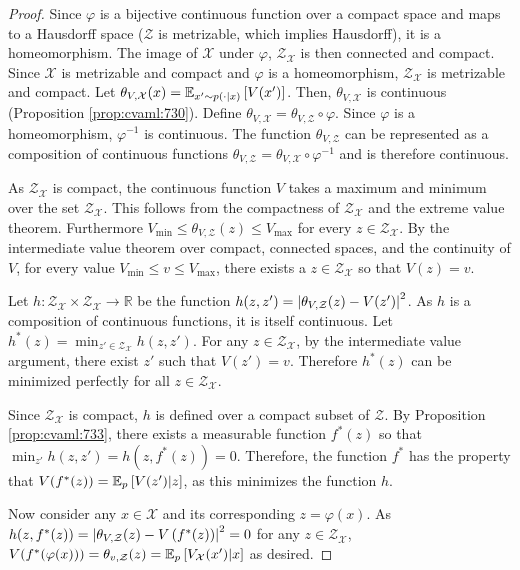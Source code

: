 \begin{proof}
    
Since $\varphi$ is a bijective continuous function over a compact space and maps to a Hausdorff space ($\mathcal{Z}$ is metrizable, which implies Hausdorff), it is a homeomorphism.
The image of $\mathcal{X}$ under $\varphi$, $\mathcal{Z}_\mathcal{X}$ is then connected and compact.
Since $\mathcal{X}$ is metrizable and compact and $\varphi$ is a homeomorphism, $\mathcal{Z}_\mathcal{X}$ is metrizable and compact.
Let $\theta_{V,\mathcal{X}}(x) = \mathbb{E}_{x' \sim p(\cdot|x)}\left[  V(x') \right]$.
Then, $\theta_{V,\mathcal{X}}$ is continuous (Proposition \autoref{prop:cvaml:730}).
Define $\theta_{V, \mathcal{X}} = \theta_{V, \mathcal{Z}} \circ \varphi$.
Since $\varphi$ is a homeomorphism, $\varphi^{-1}$ is continuous.
The function $\theta_{V, \mathcal{Z}}$ can be represented as a composition of continuous functions $\theta_{V, \mathcal{Z}} = \theta_{V, \mathcal{X}} \circ \varphi^{-1}$ and is therefore continuous.

As $\mathcal{Z}_\mathcal{X}$ is compact, the continuous function $V$ takes a maximum and minimum over the set $\mathcal{Z}_\mathcal{X}$. 
This follows from the compactness of $\mathcal{Z}_\mathcal{X}$ and the extreme value theorem. 
Furthermore $V_{\min} \leq \theta_{V,\mathcal{Z}}(z) \leq V_{\max}$ for every $z \in \mathcal{Z}_\mathcal{X}$.
By the intermediate value theorem over compact, connected spaces, and the continuity of $V$, for every value $V_{\min} \leq v \leq V_{\max}$, there exists a $z \in \mathcal{Z}_\mathcal{X}$ so that $V(z) = v$.


Let $h: \mathcal{Z}_\mathcal{X} \times \mathcal{Z}_\mathcal{X} \rightarrow \mathbb{R}$ be the function $h(z,z') = \left|\theta_{V,\mathcal{Z}}(z) - V(z')\right|^2$.
As $h$ is a composition of continuous functions, it is itself continuous.
Let $h^*(z) = \min_{z' \in \mathcal{Z}_\mathcal{X}} h(z,z')$.
For any $z \in \mathcal{Z}_\mathcal{X}$, by the intermediate value argument, there exist $z'$ such that $V(z') = v$. 
Therefore $h^*(z)$ can be minimized perfectly for all $z \in \mathcal{Z}_\mathcal{X}$.

Since $\mathcal{Z}_\mathcal{X}$ is compact, $h$ is defined over a compact subset of $\mathcal{Z}$.
By Proposition \autoref{prop:cvaml:733}, there exists a measurable function $f^*(z)$ so that $\min_{z'} h(z, z') = h(z, f^*(z)) = 0$.
Therefore, the function $f^*$ has the property that $V(f^*(z)) = \mathbb{E}_{p}\left[  V(z')|z \right]$, as this minimizes the function $h$.

Now consider any $x\in\mathcal{X}$ and its corresponding $z=\varphi(x)$.
As $h(z, f^*(z))=\left|\theta_{V,\mathcal{Z}}(z) - V\left( f^*(z) \right)\right|^2 = 0$ for any $z \in \mathcal{Z}_\mathcal{X}$, $V(f^*(\varphi(x))) = \theta_{v,\mathcal{Z}}(z) = \mathbb{E}_{p}\left[  V_\mathcal{X}(x')|x \right]$ as desired.

\end{proof}

